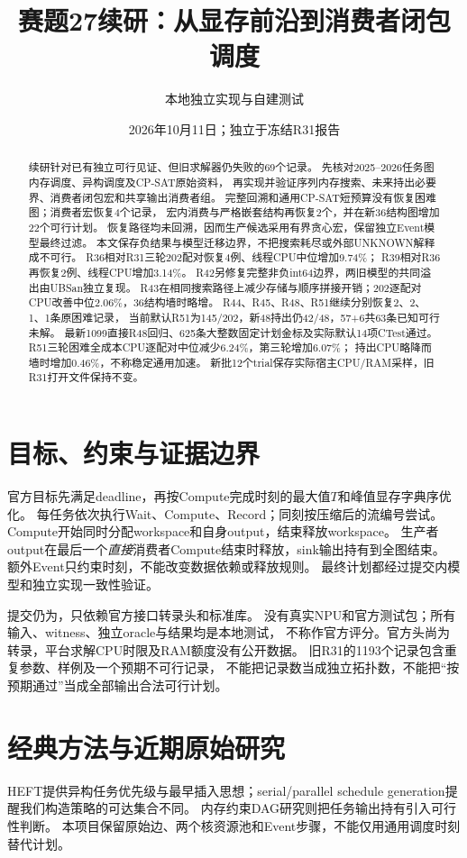 \documentclass[UTF8,fontset=fandol,11pt]{ctexart}
\title{赛题27续研：从显存前沿到消费者闭包调度}
\author{本地独立实现与自建测试}
\date{2026年10月11日；独立于冻结R31报告}
\begin{document}
\maketitle
\begin{abstract}
续研针对已有独立可行见证、但旧求解器仍失败的69个记录。
先核对2025--2026任务图内存调度、异构调度及CP-SAT原始资料，
再实现并验证序列内存搜索、未来持出必要界、消费者闭包宏和共享输出消费者组。
完整回溯和通用CP-SAT短预算没有恢复困难图；消费者宏恢复4个记录，
宏内消费与严格嵌套结构再恢复2个，并在新36结构图增加22个可行计划。
恢复路径均未回溯，因而生产候选采用有界贪心宏，保留独立Event模型最终过滤。
本文保存负结果与模型迁移边界，不把搜索耗尽或外部UNKNOWN解释成不可行。
R36相对R31三轮202配对恢复4例、线程CPU中位增加9.74\%；
R39相对R36再恢复2例、线程CPU增加3.14\%。
R42另修复完整非负int64边界，两旧模型的共同溢出由UBSan独立复现。
R43在相同搜索路径上减少存储与顺序拼接开销；202逐配对CPU改善中位2.06\%，36结构墙时略增。
R44、R45、R48、R51继续分别恢复2、2、1、1条原困难记录，
当前默认R51为145/202，新48持出仍42/48，57+6共63条已知可行未解。
最新1099直接R48回归、625条大整数固定计划金标及实际默认14项CTest通过。
R51三轮困难全成本CPU逐配对中位减少6.24\%，第三轮增加6.07\%；
持出CPU略降而墙时增加0.46\%，不称稳定通用加速。
新批12个trial保存实际宿主CPU/RAM采样，旧R31打开文件保持不变。
\end{abstract}

\section{目标、约束与证据边界}
官方目标先满足deadline，再按Compute完成时刻的最大值$T$和峰值显存字典序优化。
每任务依次执行Wait、Compute、Record；同刻按压缩后的流编号尝试。
Compute开始同时分配workspace和自身output，结束释放workspace。
生产者output在最后一个\emph{直接}消费者Compute结束时释放，sink输出持有到全图结束。
额外Event只约束时刻，不能改变数据依赖或释放规则。
最终计划都经过提交内模型和独立实现一致性验证。

提交仍为，只依赖官方接口转录头和标准库。
没有真实NPU和官方测试包；所有输入、witness、独立oracle与结果均是本地测试，
不称作官方评分。官方头尚为转录，平台求解CPU时限及RAM额度没有公开数据。
旧R31的1193个记录包含重复参数、样例及一个预期不可行记录，
不能把记录数当成独立拓扑数，不能把“按预期通过”当成全部输出合法可行计划。

\section{经典方法与近期原始研究}
HEFT\cite{heft}提供异构任务优先级与最早插入思想；serial/parallel
schedule generation\cite{kolisch}提醒我们构造策略的可达集合不同。
内存约束DAG研究\cite{marchal}则把任务输出持有引入可行性判断。
本项目保留原始边、两个核资源池和Event步骤，不能仅用通用调度时刻替代计划。
\end{document}
